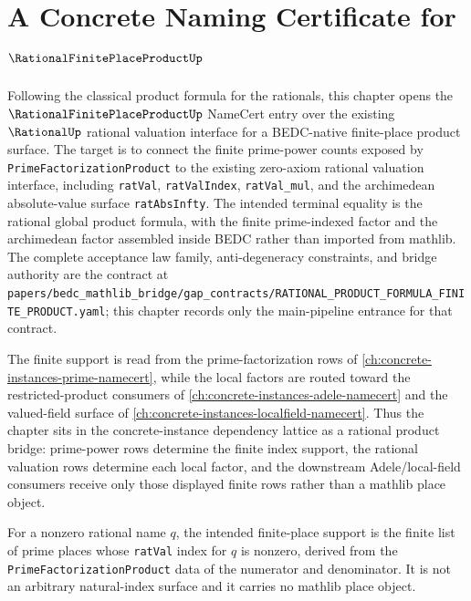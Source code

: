 \chapter{A Concrete Naming Certificate for $\RationalFinitePlaceProductUp$}
\label{ch:concrete-instances-rational-finite-place-product-namecert}

Following the classical product formula for the rationals, this chapter opens the $\RationalFinitePlaceProductUp$ NameCert entry over the existing $\RationalUp$ rational valuation interface for a BEDC-native finite-place product surface. The target is to connect the finite prime-power counts exposed by \texttt{PrimeFactorizationProduct} to the existing zero-axiom rational valuation interface, including \texttt{ratVal}, \texttt{ratValIndex}, \texttt{ratVal\_mul}, and the archimedean absolute-value surface \texttt{ratAbsInfty}. The intended terminal equality is the rational global product formula, with the finite prime-indexed factor and the archimedean factor assembled inside BEDC rather than imported from mathlib. The complete acceptance law family, anti-degeneracy constraints, and bridge authority are the contract at \texttt{papers/bedc\_mathlib\_bridge/gap\_contracts/RATIONAL\_PRODUCT\_FORMULA\_FINITE\_PRODUCT.yaml}; this chapter records only the main-pipeline entrance for that contract.

The finite support is read from the prime-factorization rows of \autoref{ch:concrete-instances-prime-namecert}, while the local factors are routed toward the restricted-product consumers of \autoref{ch:concrete-instances-adele-namecert} and the valued-field surface of \autoref{ch:concrete-instances-localfield-namecert}. Thus the chapter sits in the concrete-instance dependency lattice as a rational product bridge: prime-power rows determine the finite index support, the rational valuation rows determine each local factor, and the downstream Adele/local-field consumers receive only those displayed finite rows rather than a mathlib place object.

\begin{definition}
\label{def:rational-finite-place-support-target}
For a nonzero rational name $q$, the intended finite-place support is the finite list of prime places whose \texttt{ratVal} index for $q$ is nonzero, derived from the \texttt{PrimeFactorizationProduct} data of the numerator and denominator. It is not an arbitrary natural-index surface and it carries no mathlib place object.
\end{definition}

